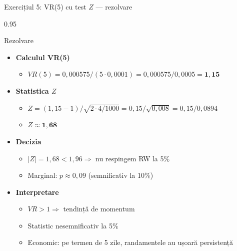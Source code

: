 \documentclass[9pt, aspectratio=169, t]{beamer}
\begin{document}
\begin{frame}[shrink=15]{Exercițiul 5: VR(5) cu test $Z$ --- rezolvare}
\begin{cminipage}{0.95\textwidth}
\begin{exampleblock}{Rezolvare}
\begin{itemize}\setlength{\itemsep}{0pt}
    \item \textbf{Calculul VR(5)}
    \begin{itemize}\setlength{\itemsep}{0pt}
        \item $VR(5) = 0{,}000575/(5 \cdot 0{,}0001) = 0{,}000575/0{,}0005 = \mathbf{1{,}15}$
    \end{itemize}
    \item \textbf{Statistica $Z$}
    \begin{itemize}\setlength{\itemsep}{0pt}
        \item $Z = (1{,}15 - 1)/\sqrt{2 \cdot 4/1000} = 0{,}15/\sqrt{0{,}008} = 0{,}15/0{,}0894$
        \item $Z \approx \mathbf{1{,}68}$
    \end{itemize}
    \item \textbf{Decizia}
    \begin{itemize}\setlength{\itemsep}{0pt}
        \item $|Z| = 1{,}68 < 1{,}96 \Rightarrow$ nu respingem RW la 5\%
        \item Marginal: $p \approx 0{,}09$ (semnificativ la 10\%)
    \end{itemize}
    \item \textbf{Interpretare}
    \begin{itemize}\setlength{\itemsep}{0pt}
        \item $VR > 1 \Rightarrow$ tendință de momentum
        \item Statistic nesemnificativ la 5\%
        \item Economic: pe termen de 5 zile, randamentele au ușoară persistență
    \end{itemize}
\end{itemize}
\end{exampleblock}
\end{cminipage}
\end{frame}
\end{document}
